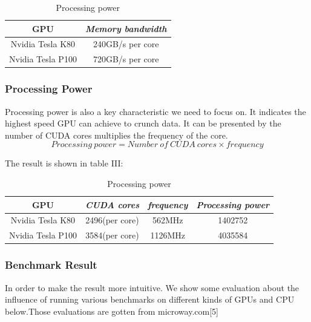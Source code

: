 \documentclass[conference]{IEEEtran}
\begin{document}
\begin{table}[H]
\caption{Processing power}
\begin{center}
\begin{tabular}{|c|c|}
\hline
\textbf{GPU} & \textbf{\textit{Memory bandwidth}}\\
\hline
Nvidia Tesla K80 & 240GB/s per core \\
\hline
Nvidia Tesla P100 & 720GB/s per core\\
\hline
\end{tabular}
\end{center}
\end{table}




\subsubsection{Processing Power}
Processing power is also a key characteristic we need to focus on. It indicates the highest speed GPU can achieve to crunch data. It can be presented by the number of CUDA cores multiplies the frequency of the core.
$$Processing \ power = Number \ of \ CUDA \ cores \times frequency $$

The result is shown in table III:

\begin{table}[t]
\caption{Processing power}
\begin{center}
\begin{tabular}{|c|c|c|c|}
\hline
\textbf{GPU} & \textbf{\textit{CUDA cores}}& \textbf{\textit{frequency}}& \textbf{\textit{Processing power}} \\
\hline
Nvidia Tesla K80 & 2496(per core)& 562MHz & 1402752 \\
\hline
Nvidia Tesla P100 & 3584(per core)& 1126MHz & 4035584 \\
\hline
\end{tabular}
\label{tab2}
\end{center}
\end{table}

\subsubsection{Benchmark Result}

In order to make the result more intuitive. We show some evaluation about the influence of running various benchmarks on different kinds of GPUs and CPU below.Those evaluations are gotten from microway.com[5]
\end{document}
